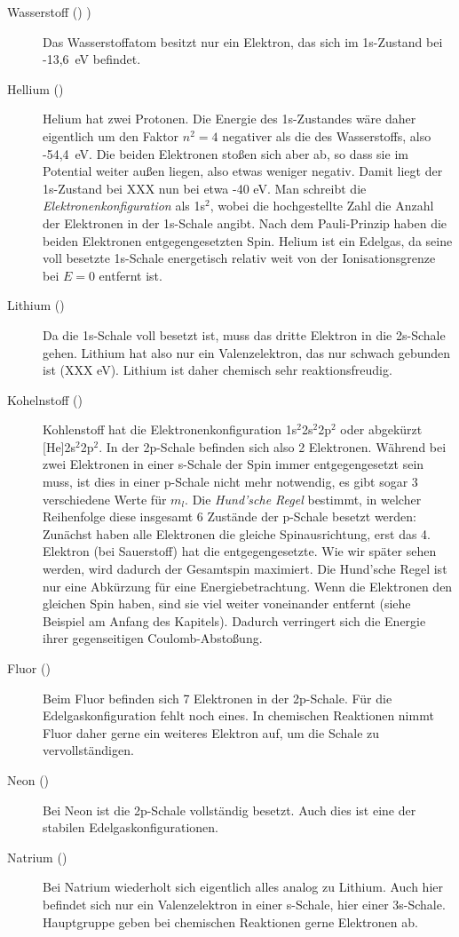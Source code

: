 \begin{description}
    \item[Wasserstoff () )] Das Wasserstoffatom besitzt nur ein Elektron, das sich im 1s-Zustand bei -13,6~eV befindet.
  
  \item[Hellium ()] Helium hat zwei Protonen. Die Energie des 1s-Zustandes wäre daher eigentlich um den Faktor $n^2 = 4$ negativer als die des Wasserstoffs, also -54,4~eV. Die beiden Elektronen stoßen sich aber ab, so dass sie im Potential weiter außen liegen, also etwas weniger negativ. Damit liegt der 1s-Zustand bei XXX nun bei etwa -40 eV. Man schreibt die \emph{Elektronenkonfiguration} als 1s$^2$, wobei die hochgestellte Zahl die Anzahl der Elektronen in der 1s-Schale angibt. Nach dem Pauli-Prinzip haben die beiden Elektronen entgegengesetzten Spin. Helium ist ein Edelgas, da seine voll besetzte 1s-Schale energetisch relativ weit von der Ionisationsgrenze bei $E=0$ entfernt ist.
   
    \item[Lithium ()] Da die 1s-Schale voll besetzt ist, muss das dritte Elektron in die 2s-Schale gehen. Lithium hat also nur ein Valenzelektron, das nur schwach gebunden ist (XXX eV). Lithium ist daher chemisch sehr reaktionsfreudig.
    
    \item[Kohelnstoff ()]   Kohlenstoff hat die Elektronenkonfiguration 1s$^2$2s$^2$2p$^2$ oder abgekürzt [He]2s$^2$2p$^2$. In der 2p-Schale befinden sich also 2 Elektronen. Während bei zwei Elektronen in einer s-Schale der Spin immer entgegengesetzt sein muss, ist dies in einer p-Schale nicht mehr notwendig, es gibt sogar 3 verschiedene Werte für $m_l$. Die \emph{Hund'sche Regel} bestimmt, in welcher Reihenfolge diese insgesamt 6 Zustände der p-Schale besetzt werden: Zunächst haben alle Elektronen die gleiche Spinausrichtung, erst das 4. Elektron (bei Sauerstoff) hat die entgegengesetzte. Wie wir später sehen werden, wird dadurch der Gesamtspin maximiert. Die Hund'sche Regel ist nur eine Abkürzung für eine Energiebetrachtung. Wenn die Elektronen den gleichen Spin haben, sind sie viel weiter voneinander entfernt (siehe Beispiel am Anfang des Kapitels). Dadurch verringert sich die Energie ihrer gegenseitigen Coulomb-Abstoßung.
    
    \item[Fluor ()] Beim Fluor befinden sich 7 Elektronen in der 2p-Schale. Für die Edelgaskonfiguration fehlt noch eines. In chemischen Reaktionen nimmt Fluor daher gerne ein weiteres Elektron auf, um die Schale zu vervollständigen.

    \item[Neon ()]  Bei Neon ist die 2p-Schale vollständig besetzt. Auch dies ist eine der stabilen Edelgaskonfigurationen.
    
    \item[Natrium ()] Bei Natrium wiederholt sich eigentlich alles analog zu Lithium. Auch hier befindet sich nur ein Valenzelektron in einer s-Schale, hier einer 3s-Schale. Hauptgruppe geben bei chemischen Reaktionen gerne Elektronen ab.
\end{description}

